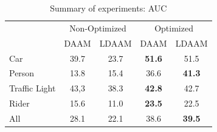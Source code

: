 \begin{table}[ht]
\centering
\begin{tabular}{l|cc|cc|}
\cline{2-5}
\multirow{2}{*}{}                   & \multicolumn{2}{c|}{Non-Optimized} & \multicolumn{2}{c|}{Optimized}                     \\ \cline{2-5} 
                                    & \multicolumn{1}{c|}{DAAM}  & LDAAM & \multicolumn{1}{c|}{DAAM}          & LDAAM         \\ \hline
\multicolumn{1}{|l|}{Car}           & \multicolumn{1}{c|}{39.7}  & 23.7  & \multicolumn{1}{c|}{\textbf{51.6}} & 51.5          \\
\multicolumn{1}{|l|}{Person}        & \multicolumn{1}{c|}{13.8}  & 15.4  & \multicolumn{1}{c|}{36.6}          & \textbf{41.3} \\
\multicolumn{1}{|l|}{Traffic Light} & \multicolumn{1}{c|}{43,3}  & 38.3  & \multicolumn{1}{c|}{\textbf{42.8}} & 42.7          \\
\multicolumn{1}{|l|}{Rider}         & \multicolumn{1}{c|}{15.6}  & 11.0  & \multicolumn{1}{c|}{\textbf{23.5}} & 22.5          \\ \hline
\multicolumn{1}{|l|}{All}           & \multicolumn{1}{c|}{28.1}  & 22.1  & \multicolumn{1}{c|}{38.6}          & \textbf{39.5} \\ \hline
\end{tabular}
\caption[Summary of experiments: AUC]{Summary of experiments: AUC}
    \label{tab:summary-iou-results-auc}
\end{table}




